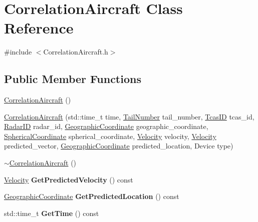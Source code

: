 \hypertarget{class_correlation_aircraft}{}\section{Correlation\+Aircraft Class Reference}
\label{class_correlation_aircraft}


{\ttfamily \#include $<$Correlation\+Aircraft.\+h$>$}

\subsection*{Public Member Functions}
\begin{DoxyCompactItemize}
\item 
\hyperlink{class_correlation_aircraft_a2bbdee62edd0d91b2a7af718a4260ccc}{Correlation\+Aircraft} ()
\item 
\hyperlink{class_correlation_aircraft_af7d072c5dbd8c3340378ff0e19dea75e}{Correlation\+Aircraft} (std\+::time\+\_\+t time, \hyperlink{class_tail_number}{Tail\+Number} tail\+\_\+number, \hyperlink{class_tcas_i_d}{Tcas\+I\+D} tcas\+\_\+id, \hyperlink{class_radar_i_d}{Radar\+I\+D} radar\+\_\+id, \hyperlink{class_geographic_coordinate}{Geographic\+Coordinate} geographic\+\_\+coordinate, \hyperlink{class_spherical_coordinate}{Spherical\+Coordinate} spherical\+\_\+coordinate, \hyperlink{class_velocity}{Velocity} velocity, \hyperlink{class_velocity}{Velocity} predicted\+\_\+vector, \hyperlink{class_geographic_coordinate}{Geographic\+Coordinate} predicted\+\_\+location, Device type)
\item 
\hyperlink{class_correlation_aircraft_a43e80790bb9ea113fc90612698e4b3be}{$\sim$\+Correlation\+Aircraft} ()
\item 
\hypertarget{class_correlation_aircraft_af574569c6aedd437280bb603a090f010}{}\hyperlink{class_velocity}{Velocity} {\bfseries Get\+Predicted\+Velocity} () const \label{class_correlation_aircraft_af574569c6aedd437280bb603a090f010}

\item 
\hypertarget{class_correlation_aircraft_a7d0f0a8f9c47f7596c1e4467499662e6}{}\hyperlink{class_geographic_coordinate}{Geographic\+Coordinate} {\bfseries Get\+Predicted\+Location} () const \label{class_correlation_aircraft_a7d0f0a8f9c47f7596c1e4467499662e6}

\item 
\hypertarget{class_correlation_aircraft_acca81110480d7891f6860c6710902dbd}{}std\+::time\+\_\+t {\bfseries Get\+Time} () const \label{class_correlation_aircraft_acca81110480d7891f6860c6710902dbd}


\end{DoxyCompactItemize}
